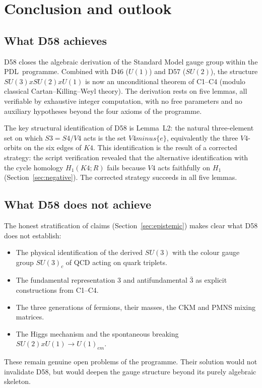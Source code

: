 \documentclass[11pt,a4paper]{article}
\def\Sfour{S4}%
\def\Vfour{V4}%
\def\Sthree{S3}%
\def\SUthree{SU(3)}%
\def\SUtwo{SU(2)}%
\def\Uone{U(1)}%
\def\Kfour{K4}%
\def\PDL{PDL}%
\def\times{x}%
\def\setminus{ minus }%
\def\RR{R}%
\def\mathbb#1{#1}%
\def\mathrm#1{#1}%
\def\mathbf#1{#1}%
\def\textsc#1{#1}%
\theoremstyle{plain}
\theoremstyle{definition}
\theoremstyle{remark}
\newcommand{\PDL}{\textsc{PDL}}
\newcommand{\Kfour}{K_4}
\newcommand{\Sfour}{S_4}
\newcommand{\Vfour}{V_4}
\newcommand{\Sthree}{S_3}
\newcommand{\SUthree}{\mathrm{SU}(3)}
\newcommand{\SUtwo}{\mathrm{SU}(2)}
\newcommand{\Uone}{\mathrm{U}(1)}
\newcommand{\RR}{\mathbb{R}}
\begin{document}
\section{Conclusion and outlook}
\label{sec:conclusion}

\subsection{What D58 achieves}

D58 closes the algebraic derivation of the Standard Model gauge group within the \PDL\ programme. Combined with D46 ($\Uone$) and D57 ($\SUtwo$), the structure $\SUthree \times \SUtwo \times \Uone$ is now an unconditional theorem of C1--C4 (modulo classical Cartan--Killing--Weyl theory). The derivation rests on five lemmas, all verifiable by exhaustive integer computation, with no free parameters and no auxiliary hypotheses beyond the four axioms of the programme.

The key structural identification of D58 is Lemma~L2: the natural three-element set on which $\Sthree = \Sfour/\Vfour$ acts is the set $\Vfour \setminus \{e\}$, equivalently the three $\Vfour$-orbits on the six edges of $\Kfour$. This identification is the result of a corrected strategy: the script verification revealed that the alternative identification with the cycle homology $H_1(\Kfour;\RR)$ fails because $\Vfour$ acts faithfully on $H_1$ (Section~\ref{sec:negative}). The corrected strategy succeeds in all five lemmas.

\subsection{What D58 does not achieve}

The honest stratification of claims (Section~\ref{sec:epistemic}) makes clear what D58 does not establish:
\begin{itemize}[leftmargin=2em]
\item The physical identification of the derived $\SUthree$ with the colour gauge group $\SUthree_{\mathrm{c}}$ of QCD acting on quark triplets.
\item The fundamental representation $\mathbf{3}$ and antifundamental $\bar{\mathbf{3}}$ as explicit constructions from C1--C4.
\item The three generations of fermions, their masses, the CKM and PMNS mixing matrices.
\item The Higgs mechanism and the spontaneous breaking $\SUtwo \times \Uone \to \Uone_{\mathrm{em}}$.
\end{itemize}
These remain genuine open problems of the programme. Their solution would not invalidate D58, but would deepen the gauge structure beyond its purely algebraic skeleton.
\end{document}
